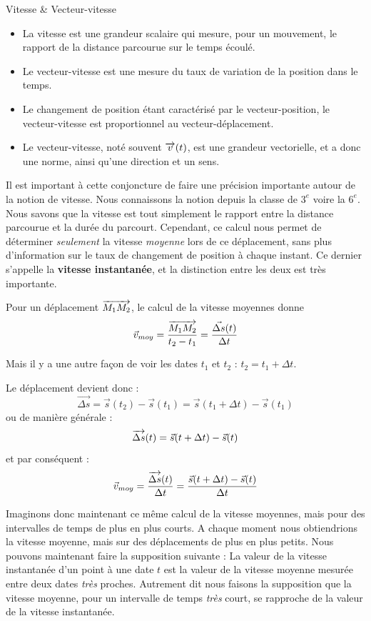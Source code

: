 \documentclass[11pt,a4paper]{article}
\begin{document}
\endgroup
    
\begin{defn}{Vitesse \& Vecteur-vitesse}
\begin{itemize}
    \item La vitesse est une grandeur scalaire qui mesure, pour un mouvement, le rapport de la distance parcourue sur le temps écoulé.     
    \item Le vecteur-vitesse est une mesure du taux de variation de la position dans le temps. 
    \item Le changement de position étant caractérisé par le vecteur-position, le vecteur-vitesse est proportionnel au vecteur-déplacement.  
    \item 	Le vecteur-vitesse, noté souvent $\overrightarrow{v}(t)$, est une grandeur vectorielle, et a donc une norme, ainsi qu’une direction et un sens. 
\end{itemize}
\end{defn}

Il est important à cette conjoncture de faire une précision importante autour de la notion de vitesse. Nous connaissons la notion depuis la classe de $3^e$ voire la $6^e$. Nous savons que la vitesse est tout simplement le rapport entre la distance parcourue et la durée du parcourt. Cependant, ce calcul nous permet de déterminer \textit{seulement} la vitesse \textit{moyenne} lors de ce déplacement, sans plus d'information sur le taux de changement de position à chaque instant. Ce dernier s'appelle la \textbf{vitesse instantanée}, et la distinction entre les deux est très importante. 

Pour un déplacement $\overrightarrow{M_1M_2}$, le calcul de la vitesse moyennes donne 
\[
\vec{v}_{moy} = \dfrac{\overrightarrow{M_1M_2}}{t_2 - t_1} = \dfrac{\vec{\Delta s}(t) }{\Delta t}
\]

Mais il y a une autre façon de voir les dates $t_1$ et $t_2$ : $t_2 = t_1 + \Delta t$. 

Le déplacement devient donc  : 
\[
\vec{\Delta s} = \vec{s}(t_2) - \vec{s}(t_1) = \vec{s}(t_1 + \Delta t) - \vec{s}(t_1)
\]
ou de manière générale : 
\[
\overrightarrow{\Delta s}(t) =  \vec{s}(t + \Delta t) - \vec{s}(t)
\]
et par conséquent : 
\[
\vec{v}_{moy} = \dfrac{\overrightarrow{\Delta s}(t) }{\Delta t} = \dfrac{\vec{s}(t + \Delta t) - \vec{s}(t)}{\Delta t}
\]

Imaginons donc maintenant ce même calcul de la vitesse moyennes, mais pour des intervalles de temps de plus en plus courts. A chaque moment nous obtiendrions la vitesse moyenne, mais sur des déplacements de plus en plus petits. Nous pouvons maintenant faire la supposition suivante : La valeur de la vitesse instantanée d’un point à une date $t$ est la valeur de la vitesse moyenne mesurée entre deux dates \textit{très} proches.  Autrement dit nous faisons la supposition que la vitesse moyenne, pour un intervalle de temps \textit{très} court, se rapproche de la valeur de la vitesse instantanée. 
\end{document}
